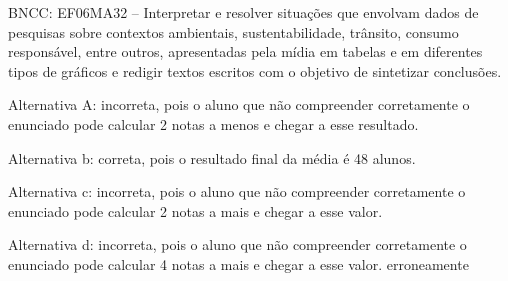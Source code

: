 \begin{enumerate}
BNCC: EF06MA32 -- Interpretar e resolver situações que envolvam dados de
pesquisas sobre contextos ambientais, sustentabilidade, trânsito,
consumo responsável, entre outros, apresentadas pela mídia em tabelas e
em diferentes tipos de gráficos e redigir textos escritos com o objetivo
de sintetizar conclusões.

Alternativa A: incorreta, pois o aluno que não compreender corretamente
o enunciado pode calcular 2 notas a menos e chegar a esse resultado.

Alternativa b: correta, pois o resultado final da média é 48 alunos.

Alternativa c: incorreta, pois o aluno que não compreender corretamente
o enunciado pode calcular 2 notas a mais e chegar a esse valor.

Alternativa d: incorreta, pois o aluno que não compreender corretamente
o enunciado pode calcular 4 notas a mais e chegar a esse valor.
erroneamente

	\end{enumerate}



